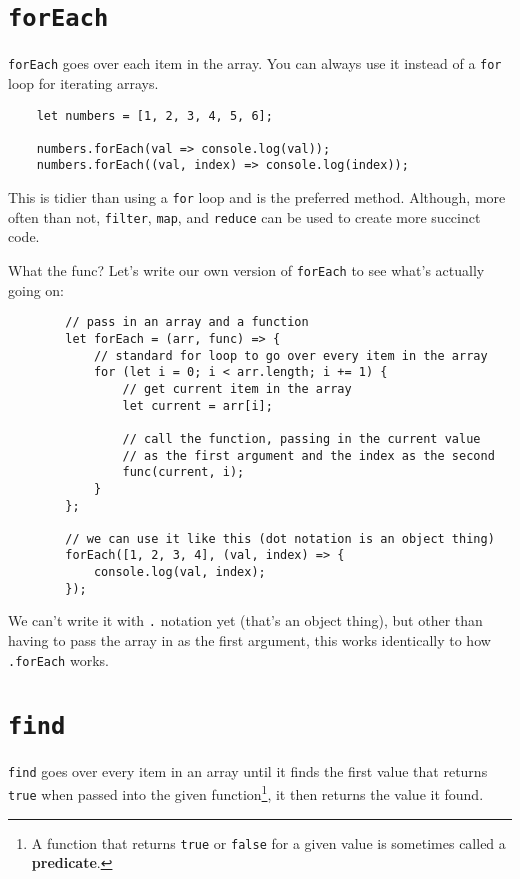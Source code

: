 \section{\texttt{forEach}}

\texttt{forEach} goes over each item in the array. You can always use it instead of a \texttt{for} loop for iterating arrays.

\begin{verbatim}
    let numbers = [1, 2, 3, 4, 5, 6];

    numbers.forEach(val => console.log(val));
    numbers.forEach((val, index) => console.log(index));
\end{verbatim}

This is tidier than using a \texttt{for} loop and is the preferred method. Although, more often than not, \texttt{filter}, \texttt{map}, and \texttt{reduce} can be used to create more succinct code.


\begin{infobox}{What the func?}
    Let's write our own version of \texttt{forEach} to see what's actually going on:

    \begin{verbatim}
        // pass in an array and a function
        let forEach = (arr, func) => {
            // standard for loop to go over every item in the array
            for (let i = 0; i < arr.length; i += 1) {
                // get current item in the array
                let current = arr[i];

                // call the function, passing in the current value
                // as the first argument and the index as the second
                func(current, i);
            }
        };

        // we can use it like this (dot notation is an object thing)
        forEach([1, 2, 3, 4], (val, index) => {
            console.log(val, index);
        });
    \end{verbatim}

    We can't write it with \texttt{.} notation yet (that's an object thing), but other than having to pass the array in as the first argument, this works identically to how \texttt{.forEach} works.
\end{infobox}


\section{\texttt{find}}

\texttt{find} goes over every item in an array until it finds the first value that returns \texttt{true} when passed into the given function\footnote{A function that returns \texttt{true} or \texttt{false} for a given value is sometimes called a \textbf{predicate}.}, it then returns the value it found.

